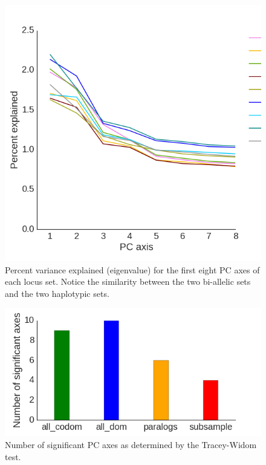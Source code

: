\documentclass[12pt, one column]{article}
\begin{document}
\begin{figure}[H]
\includegraphics[scale=.4]{figures/supplemental/PCA_eigenvalues.png}
\caption[SUPPLEMENTAL - PCA eigenvalues]{Percent variance explained (eigenvalue) for the first eight PC axes of each locus set.  Notice the similarity between the two bi-allelic sets and the two haplotypic sets.}
\end{figure}

\begin{figure}[H]
\includegraphics[scale=.4]{figures/supplemental/TW_stats.png}
\caption[SUPPLEMENTAL - PCA significant axes]{Number of significant PC axes as determined by the Tracey-Widom test.}
\end{figure}
\end{document}
